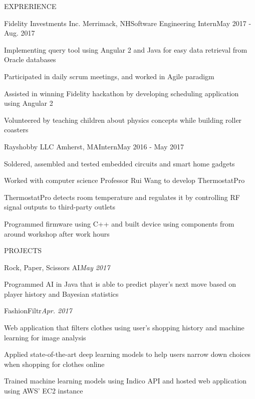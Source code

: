 \documentclass{resume} %
\begin{document}
	\begin{rSection}{EXPRERIENCE}
			
		\begin{rSubsection}{Fidelity Investments Inc.} {Merrimack, NH}{Software Engineering Intern}{May 2017 - Aug. 2017}
			\item Implementing query tool using Angular 2 and Java for easy data retrieval from Oracle databases
			\item Participated in daily scrum meetings, and worked in Agile paradigm
			\item Assisted in winning Fidelity hackathon by developing scheduling application using Angular 2
			\item Volunteered by teaching children about physics concepts while building roller coasters
		\end{rSubsection}
	
		\begin{rSubsection}{Rayshobby LLC} {Amherst, MA}{Intern}{May 2016 - May 2017}
			\item Soldered, assembled and tested embedded circuits and smart home gadgets
			\item Worked with computer science Professor Rui Wang to develop ThermostatPro
			\item ThermostatPro detects room temperature and regulates it by controlling RF signal outputs to third-party outlets
			\item Programmed firmware using C++ and built device using components from around workshop after work hours
		\end{rSubsection}
	
	\end{rSection}
	
	
	\begin{rSection}{PROJECTS}
	
		\begin{rSubsection}{Rock, Paper, Scissors AI}{\textit{May 2017}}{}{}
			\item Programmed AI in Java that is able to predict player's next move based on player history and Bayesian statistics
		\end{rSubsection}
	
		\begin{rSubsection}{FashionFiltr}{\textit{Apr. 2017}}{}{}
			\item Web application that filters clothes using user's shopping history and machine learning for image analysis
			\item Applied state-of-the-art deep learning models to help users narrow down choices when shopping for clothes online
			\item Trained machine learning models using Indico API and hosted web application using AWS' EC2 instance
		\end{rSubsection}
	
	\end{rSection}
\end{document}
